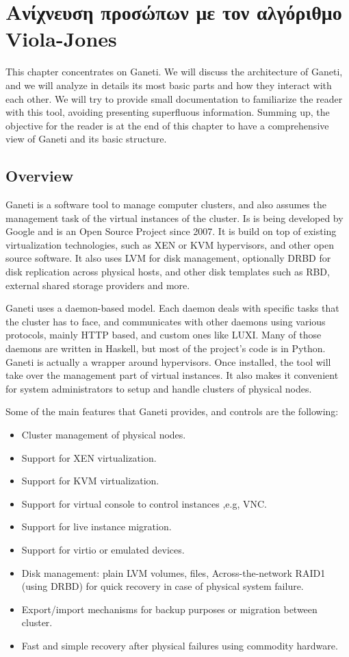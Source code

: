 \chapter{Ανίχνευση προσώπων με τον αλγόριθμο Viola-Jones}\label{ch:violajones}

This chapter concentrates on Ganeti. We will discuss the architecture of Ganeti,
and we will analyze in details its most basic parts and how they interact with
each other. We will try to provide small documentation to familiarize the reader
with this tool, avoiding presenting superfluous information. Summing up, the
objective for the reader is at the end of this chapter to have a comprehensive
view of Ganeti and its basic structure.

\section{Overview}

Ganeti is a software tool to manage computer clusters, and also assumes the
management task of the virtual instances of the cluster. Is is being
developed by Google and is an Open Source Project since 2007. It is build on top
of existing virtualization technologies, such as XEN or KVM hypervisors, and
other open source software. It also uses LVM for disk management, optionally
DRBD for disk replication across physical hosts, and other disk templates such
as RBD, external shared storage providers and more.

Ganeti uses a daemon-based model. Each daemon deals with specific tasks that the
cluster has to face, and communicates with other daemons using various
protocols, mainly HTTP based, and custom ones like LUXI. Many of those daemons
are written in Haskell, but most of the project's code is in Python. Ganeti is
actually a wrapper around hypervisors. Once installed, the tool will take over
the management part of virtual instances. It also makes it convenient for system
administrators to setup and handle clusters of physical nodes.

Some of the main features that Ganeti provides, and controls are the following:

\begin{itemize}
  \item Cluster management of physical nodes.
  \item Support for XEN virtualization.
  \item Support for KVM virtualization.
  \item Support for virtual console to control instances ,e.g, VNC.
  \item Support for live instance migration.
  \item Support for virtio or emulated devices.
  \item Disk management: plain LVM volumes, files, Across-the-network RAID1
        (using DRBD) for quick recovery in case of physical system failure.
  \item Export/import mechanisms for backup purposes or migration between
        cluster.
  \item Fast and simple recovery after physical failures using commodity
        hardware.
\end{itemize}

